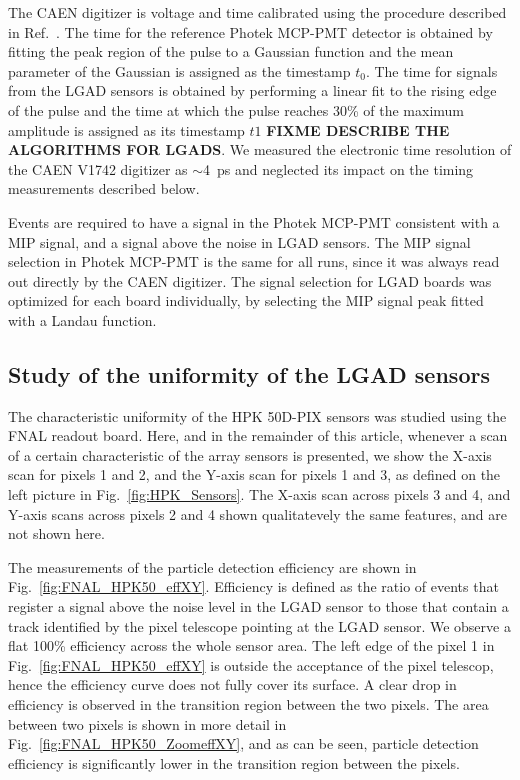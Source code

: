 \documentclass[preprint,1p]{elsarticle}
\begin{document}
The CAEN digitizer is voltage and time calibrated using the procedure described
in Ref.~\cite{Kim201467}. The time for the reference Photek MCP-PMT detector is
obtained by fitting the peak region of the pulse to a Gaussian function and the
mean parameter of the Gaussian is assigned as the timestamp $t_0$. The time for
signals from the LGAD sensors is obtained by performing a linear fit to the
rising edge of the pulse and the time at which the pulse reaches 30\% of the
maximum amplitude is assigned as its timestamp $t1$ \textbf{FIXME DESCRIBE THE
ALGORITHMS FOR LGADS}. We measured the electronic time resolution of the CAEN
V1742 digitizer as $\sim$4~ps and neglected its impact on the timing
measurements described below. 

Events are required to have a signal in the Photek MCP-PMT consistent with a MIP
signal, and a signal above the noise in LGAD sensors. The MIP signal selection
in Photek MCP-PMT is the same for all runs, since it was always read out
directly by the CAEN digitizer. The signal selection for LGAD boards was
optimized for each board individually, by selecting the MIP signal peak fitted
with a Landau function. 


\subsection{Study of the uniformity of the LGAD sensors}

The characteristic uniformity of the HPK 50D-PIX sensors was studied
using the FNAL readout board. Here, and in the remainder of this article,
whenever a scan of a certain characteristic of the array sensors is presented,
we show the X-axis scan for pixels 1 and 2, and the Y-axis scan for pixels 1 and
3, as defined on the left picture in Fig.~\ref{fig:HPK_Sensors}. The X-axis scan
across pixels 3 and 4, and Y-axis scans across pixels 2 and 4 shown
qualitatevely the same features, and are not shown here. 

The measurements of the particle detection efficiency are shown in
Fig.~\ref{fig:FNAL_HPK50_effXY}. Efficiency is defined as the ratio of events
that register a signal above the noise level in the LGAD sensor to those that
contain a track identified by the pixel telescope pointing at the LGAD sensor.
We observe a flat 100\% efficiency across the whole sensor area. The left edge
of the pixel 1 in Fig.~\ref{fig:FNAL_HPK50_effXY} is outside the acceptance of
the pixel telescop, hence the efficiency curve does not fully cover its surface.
A clear drop in efficiency is observed in the transition region between the two
pixels. The area between two pixels is shown in more detail in
Fig.~\ref{fig:FNAL_HPK50_ZoomeffXY}, and as can be seen, particle detection
efficiency is significantly lower in the transition region between the pixels.
\end{document}
